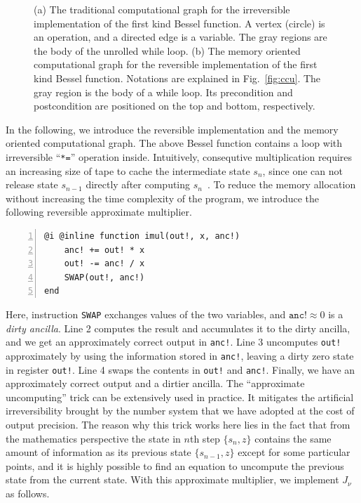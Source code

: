 \documentclass{article}
\newcommand{\<}{\langle}
\renewcommand{\>}{\rangle}
\newcommand{\Fig}[1]{Fig.~\ref{#1}}
\theoremstyle{definition}\newtheorem{definition}{\textit{Definition}}
\begin{document}
\begin{figure}[t!]
\begin{subfigure}[t]{0.47\textwidth}
        \caption{}
    \end{subfigure}
    \caption{(a) The traditional computational graph for the irreversible implementation of the first kind Bessel function. A vertex (circle) is an operation, and a directed edge is a variable. The gray regions are the body of the unrolled while loop.
        (b) The memory oriented computational graph for the reversible implementation of the first kind Bessel function. Notations are explained in \Fig{fig:ccu}.
    The gray region is the body of a while loop. Its precondition and postcondition are positioned on the top and bottom, respectively.
    }\label{fig:cgraphs}
\end{figure}

In the following, we introduce the reversible implementation and the memory oriented computational graph.
The above Bessel function contains a loop with irreversible ``\texttt{*=}'' operation inside.
Intuitively, consequtive multiplication requires an increasing size of tape to cache the intermediate state $s_n$, since one can not release state $s_{n-1}$ directly after computing $s_n$~\cite{Perumalla2013}.
To reduce the memory allocation without increasing the time complexity of the program, we introduce the following reversible approximate multiplier.

\begin{minipage}{.88\columnwidth}
    \begin{lstlisting}[numberstyle=\scriptsize\color{gray},numbers=left,numbersep=8pt]
@i @inline function imul(out!, x, anc!)
    anc! += out! * x
    out! -= anc! / x
    SWAP(out!, anc!)
end
\end{lstlisting}
\end{minipage}

Here, instruction \texttt{SWAP} exchanges values of the two variables, and $\texttt{anc!} \approx 0$ is a \textit{dirty ancilla}.
Line 2 computes the result and accumulates it to the dirty ancilla, and we get an approximately correct output in \texttt{anc!}.
Line 3 uncomputes \texttt{out!} approximately by using the information stored in \texttt{anc!}, leaving a dirty zero state in register \texttt{out!}.
Line 4 swaps the contents in \texttt{out!} and \texttt{anc!}.
Finally, we have an approximately correct output and a dirtier ancilla.
The ``approximate uncomputing'' trick can be extensively used in practice. It mitigates the artificial irreversibility brought by the number system that we have adopted at the cost of output precision.
The reason why this trick works here lies in the fact that from the mathematics perspective the state in $n$th step $\{s_n, z\}$ contains the same amount of information as its previous state  $\{s_{n-1}, z\}$ except for some particular points, and it is highly possible to find an equation to uncompute the previous state from the current state.
With this approximate multiplier, we implement $J_\nu$ as follows.
\end{document}
